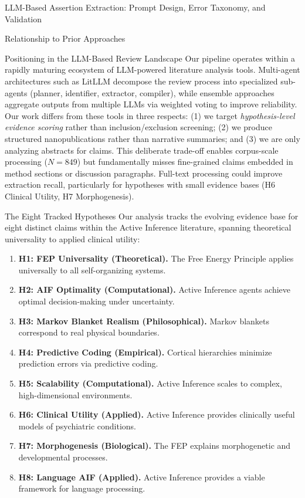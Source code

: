 \documentclass[
  ignorenonframetext,
]{beamer}
\providecommand{\tightlist}{%
  \setlength{\itemsep}{0pt}\setlength{\parskip}{0pt}}
\begin{document}
\begin{frame}[fragile]{LLM-Based Assertion Extraction: Prompt Design,
Error Taxonomy, and Validation \label{sec:extraction_pipeline}}
\begin{block}{Relationship to Prior Approaches}
\begin{block}{Positioning in the LLM-Based Review Landscape}
\protect{}\label{positioning-in-the-llm-based-review-landscape}
Our pipeline operates within a rapidly maturing ecosystem of LLM-powered
literature analysis tools. Multi-agent architectures such as LitLLM
decompose the review process into specialized sub-agents (planner,
identifier, extractor, compiler), while ensemble approaches aggregate
outputs from multiple LLMs via weighted voting to improve reliability.
Our work differs from these tools in three respects: (1) we target
\emph{hypothesis-level evidence scoring} rather than inclusion/exclusion
screening; (2) we produce structured nanopublications rather than
narrative summaries; and (3) we are only analyzing abstracts for claims.
This deliberate trade-off enables corpus-scale processing (\(N = 849\))
but fundamentally misses fine-grained claims embedded in method sections
or discussion paragraphs. Full-text processing could improve extraction
recall, particularly for hypotheses with small evidence bases (H6
Clinical Utility, H7 Morphogenesis).
\end{block}
\end{block}

\begin{block}{The Eight Tracked Hypotheses}
\protect{}\label{the-eight-tracked-hypotheses}
Our analysis tracks the evolving evidence base for eight distinct claims
within the Active Inference literature, spanning theoretical
universality to applied clinical utility:

\begin{enumerate}
\tightlist
\item
  \textbf{H1: FEP Universality (Theoretical).} The Free Energy Principle
  applies universally to all self-organizing systems.
\item
  \textbf{H2: AIF Optimality (Computational).} Active Inference agents
  achieve optimal decision-making under uncertainty.
\item
  \textbf{H3: Markov Blanket Realism (Philosophical).} Markov blankets
  correspond to real physical boundaries.
\item
  \textbf{H4: Predictive Coding (Empirical).} Cortical hierarchies
  minimize prediction errors via predictive coding.
\item
  \textbf{H5: Scalability (Computational).} Active Inference scales to
  complex, high-dimensional environments.
\item
  \textbf{H6: Clinical Utility (Applied).} Active Inference provides
  clinically useful models of psychiatric conditions.
\item
  \textbf{H7: Morphogenesis (Biological).} The FEP explains
  morphogenetic and developmental processes.
\item
  \textbf{H8: Language AIF (Applied).} Active Inference provides a
  viable framework for language processing.
\end{enumerate}
\end{block}


\end{frame}
\end{document}
